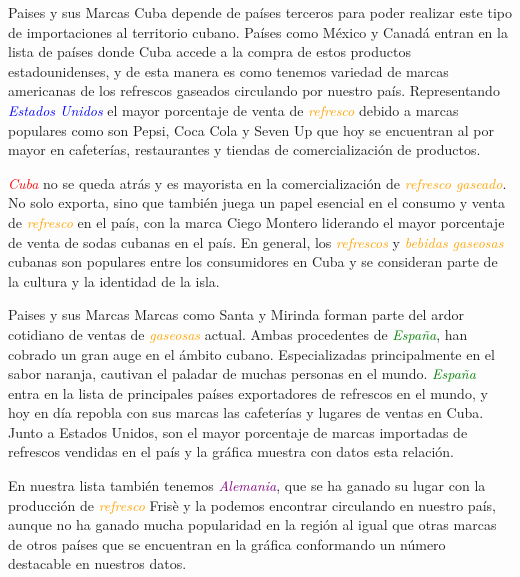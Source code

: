 \begin{frame}[fragile]{Paises y sus Marcas}
  Cuba depende de países terceros para poder realizar este tipo de importaciones al territorio cubano. 
  Países como México y Canadá entran en la lista de países donde Cuba accede a la compra de estos productos estadounidenses, y de esta manera es como tenemos variedad de marcas americanas de los refrescos gaseados circulando por nuestro país. 
  Representando \textit{\Large\textcolor{blue}{Estados Unidos}} el mayor porcentaje de venta de \textit{\Large\textcolor{orange}{refresco}} debido a marcas populares como son Pepsi, Coca Cola y Seven Up que hoy se encuentran al por mayor en cafeterías, restaurantes y tiendas de comercialización de productos.
  
  
  \textit{\Large\textcolor{red}{Cuba}} no se queda atrás y es mayorista en la comercialización de \textit{\Large\textcolor{orange}{refresco gaseado}}. 
  No solo exporta, sino que también juega un papel esencial en el consumo y venta de \textit{\Large\textcolor{orange}{refresco}} en el país, con la marca Ciego Montero liderando el mayor porcentaje de venta de sodas cubanas en el país. 
  En general, los \textit{\Large\textcolor{orange}{refrescos}} y \textit{\Large\textcolor{orange}{bebidas gaseosas}} cubanas son populares entre los consumidores en Cuba y se consideran parte de la cultura y la identidad de la isla.
\end{frame}

\begin{frame}[fragile]{Paises y sus Marcas}
  Marcas como Santa y Mirinda forman parte del ardor cotidiano de ventas de \textit{\Large\textcolor{orange}{gaseosas}} actual. 
  Ambas procedentes de \textit{\Large\textcolor{green}{España}}, han cobrado un gran auge en el ámbito cubano. 
  Especializadas principalmente en el sabor naranja, cautivan el paladar de muchas personas en el mundo. 
  \textit{\Large\textcolor{green}{España}} entra en la lista de principales países exportadores de refrescos en el mundo, y hoy en día repobla con sus marcas las cafeterías y lugares de ventas en Cuba. 
  Junto a Estados Unidos, son el mayor porcentaje de marcas importadas de refrescos vendidas en el país y la gráfica muestra con datos esta relación.

  En nuestra lista también tenemos \textit{\Large\textcolor{purple}{Alemania}}, que se ha ganado su lugar con la producción de \textit{\Large\textcolor{orange}{refresco}} Frisè y la podemos encontrar circulando en nuestro país, aunque no ha ganado mucha popularidad en la región al igual que otras marcas de otros países que se encuentran en la gráfica conformando un número destacable en nuestros datos.
\end{frame}

